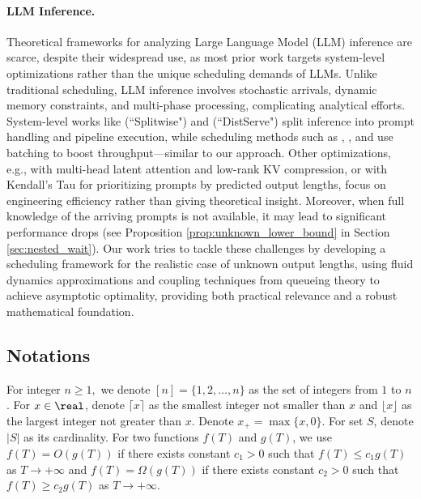 \paragraph*{LLM Inference.} 
Theoretical frameworks for analyzing Large Language Model (LLM) inference are scarce, despite their widespread use, as most prior work targets system-level optimizations rather than the unique scheduling demands of LLMs. Unlike traditional scheduling, LLM inference involves stochastic arrivals, dynamic memory constraints, and multi-phase processing, complicating analytical efforts. System-level works like \cite{patel2023peeling} (``Splitwise") and \cite{zhong2024distserve} (``DistServe") split inference into prompt handling and pipeline execution, while scheduling methods such as \cite{yu2022orca}, \cite{agrawal2023sarathi}, and \cite{agrawal2024taming} use batching to boost throughput—similar to our approach. Other optimizations, e.g., \cite{deepseekai2024deepseekv2strongeconomicalefficient} with multi-head latent attention and low-rank KV compression, or \cite{fu2025efficient} with Kendall’s Tau for prioritizing prompts by predicted output lengths, focus on engineering efficiency rather than giving theoretical insight. 
Moreover, when full knowledge of the arriving prompts is not available, it may lead to significant performance drops (see Proposition \ref{prop:unknown_lower_bound} in Section \ref{sec:nested_wait}). Our work tries to tackle these challenges by developing a scheduling framework for the realistic case of unknown output lengths, using fluid dynamics approximations and coupling techniques from queueing theory to achieve asymptotic optimality, providing both practical relevance and a robust mathematical foundation. 


\subsection{Notations}

For integer $n\ge 1,$ we denote $[n]=\{1,2,\dots,n\}$ as the set of integers from $1$ to $n$. For $x\in\real$, denote $\lceil x\rceil$ as the smallest integer not smaller than $x$ and $\lfloor x\rfloor$ as the largest integer not greater than $x$. Denote $x_+=\max\{x, 0\}$. For set $S$, denote $|S|$ as its cardinality. For two functions $f(T)$ and $g(T)$, we use $f(T)=O(g(T))$ if there exists constant $c_1>0$ such that $f(T)\le c_1g(T)$ as $T\to+\infty$ and $f(T)=\Omega(g(T))$ if there exists constant $c_2>0$ such that $f(T)\ge c_2g(T)$ as $T\to +\infty$. 